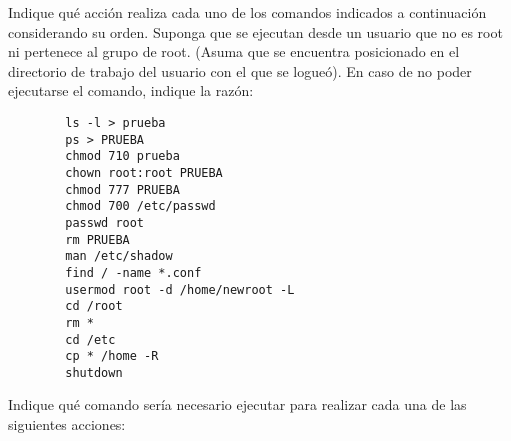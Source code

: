 \begin{questions}

\question Indique qué acción realiza cada uno de los comandos indicados a continuación considerando su orden. Suponga que se ejecutan desde un usuario que no es root ni pertenece al grupo de root. (Asuma que se encuentra posicionado en el directorio de trabajo del usuario con el que se logueó). En caso de no poder ejecutarse el comando, indique la razón:
\begin{lstlisting}
		ls -l > prueba
		ps > PRUEBA
		chmod 710 prueba
		chown root:root PRUEBA
		chmod 777 PRUEBA
		chmod 700 /etc/passwd
		passwd root
		rm PRUEBA
		man /etc/shadow
		find / -name *.conf
		usermod root -d /home/newroot -L
		cd /root
		rm *
		cd /etc
		cp * /home -R
		shutdown
\end{lstlisting}

\question Indique qué comando sería necesario ejecutar para realizar cada una de las siguientes acciones:
\end{questions}
